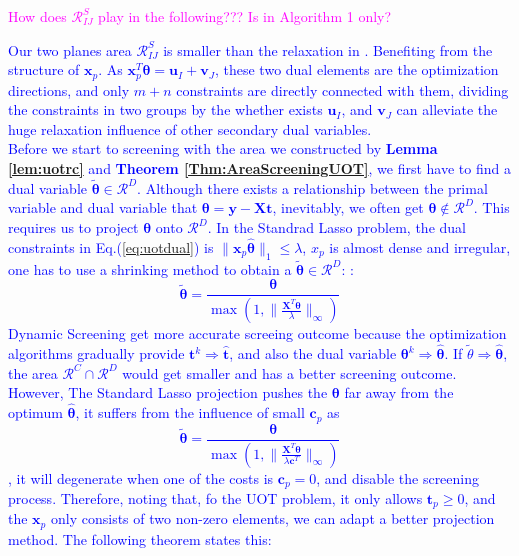 \documentclass[twoside]{article}
\theoremstyle{plain}
\newcommand{\tranT}{T}
\newcommand{\mat}[1]{\mathbf{#1}}
\renewcommand{\vec}[1]{\bm{#1}}
\newcommand{\changeHK}[1]{\textcolor{red}{#1}}
\newcommand{\changeXS}[1]{\textcolor{blue}{#1}}
\newcommand{\note}[1]{\textcolor{magenta}{#1}}
\begin{document}
\note{How does $\mathcal{R}^{S}_{IJ}$ play in the following??? Is in Algorithm 1 only?}

\changeXS{Our two planes area $\mathcal{R}^S_{IJ}$ is smaller than the relaxation in \citep{NEURIPS2021_7b5b23f4}. Benefiting from the structure of $\vec x_p$. As $\vec{x}_p^{\tranT}\vec{\theta} = \vec{u}_{I} + \vec{v}_{J}$, these two dual elements are the optimization directions, and only $m+n$ constraints are directly connected with them, dividing the constraints in two groups by the whether exists $\vec{u}_{I}$, and $\vec{v}_{J}$ can alleviate the huge relaxation influence of other secondary dual variables.\\
Before we start to screening with the area we constructed by {\bf Lemma \ref{lem:uotrc}} and {\bf Theorem \ref{Thm:AreaScreeningUOT}}, we first have to find a dual variable $\tilde{\vec{\theta}}\in\mathcal{R}^{D}$. Although there exists a relationship between the primal variable and dual variable that $\vec{\theta} = \vec{y} - \mat{X}\vec{t}$, inevitably, we often get $\vec{\theta} \notin \mathcal{R}^{D}$. This requires us to project $\vec{\theta}$ onto $\mathcal{R}^{D}$. In the Standrad Lasso problem, the dual constraints in {Eq.(\ref{eq:uotdual})} is $\|\vec{x}_p \hat{\vec{\theta}}\|_1\leq \lambda$, $x_p$ is almost dense and irregular, one has to use a shrinking method to obtain a $\tilde{\vec{\theta}} \in \mathcal{R}^{D}$:
\changeHK{\cite{xxxxx}}: 
\begin{equation*}
\tilde{\vec{\theta}} = \frac{\vec\theta}{\max(1, \|\frac{\mat{X}^{\tranT}\vec\theta}{\lambda}\|_{\infty})}
\end{equation*}
}
\changeXS{Dynamic Screening get more accurate screeing outcome because the optimization algorithms gradually provide $\vec t^{k} \Rightarrow \hat{\vec t}$, and also the dual variable $\vec \theta^{k} \Rightarrow \hat{\vec \theta}$. If $\tilde{\theta}\Rightarrow \hat{\vec \theta}$, the area $\mathcal{R}^{C}\cap\mathcal{R}^{D}$ would get smaller and has a better screening outcome. However, The Standard Lasso projection pushes the $\vec{\theta}$ far away from the optimum $\hat{\vec{\theta}}$, it suffers from the influence of small $\vec c_p$  as $$\tilde{\vec{\theta}} = \frac{\vec\theta}{\max(1, \|\frac{\mat{X}^{\tranT}\vec\theta}{\lambda \vec{c}^{T}}\|_{\infty})}$$, it will degenerate when one of the costs is $\vec{c}_p = 0$, and disable the screening process. Therefore, noting that, fo the UOT problem, it only allows $\vec{t}_p \geq 0$, and the $\vec{x}_p$ only consists of two non-zero elements, we can adapt a better projection method. The following theorem states this:}
\end{document}

